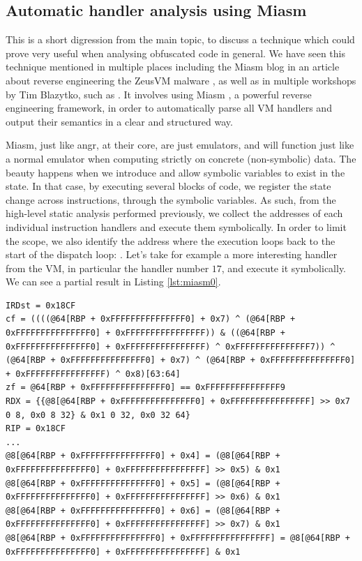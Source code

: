 \subsection{Automatic handler analysis using Miasm}
\label{sec:miasm}

This is a short digression from the main topic, to discuss a technique which could prove very useful when analysing obfuscated code in general. We have seen this technique mentioned in multiple places including the Miasm blog in an article about reverse engineering the ZeusVM malware \cite{zeusvm_miasm}, as well as in multiple workshops by Tim Blazytko, such as \cite{tim_miasm}. It involves using Miasm \cite{miasm}, a powerful reverse engineering framework, in order to automatically parse all \gls{VM} handlers and output their semantics in a clear and structured way. 

Miasm, just like angr, at their core, are just emulators, and will function just like a normal emulator when computing strictly on concrete (non-symbolic) data. The beauty happens when we introduce and allow symbolic variables to exist in the state. In that case, by executing several blocks of code, we register the state change across instructions, through the symbolic variables. As such, from the high-level static analysis performed previously, we collect the addresses of each individual instruction handlers and execute them symbolically. In order to limit the scope, we also identify the address where the execution loops back to the start of the dispatch loop: . Let's take for example a more interesting handler from the  \gls{VM}, in particular the handler number $17$, and execute it symbolically. We can see a partial result in Listing \ref{lst:miasm0}. 

\begin{lstlisting}[label={lst:miasm0}, caption={Partial result of symbolically executing a function handler in Miasm. One will notice the state change in core registers such as \cc{RDX}, flag changes, as well as changes in memory.}]
IRDst = 0x18CF
cf = ((((@64[RBP + 0xFFFFFFFFFFFFFFF0] + 0x7) ^ (@64[RBP + 0xFFFFFFFFFFFFFFF0] + 0xFFFFFFFFFFFFFFFF)) & ((@64[RBP + 0xFFFFFFFFFFFFFFF0] + 0xFFFFFFFFFFFFFFFF) ^ 0xFFFFFFFFFFFFFFF7)) ^ (@64[RBP + 0xFFFFFFFFFFFFFFF0] + 0x7) ^ (@64[RBP + 0xFFFFFFFFFFFFFFF0] + 0xFFFFFFFFFFFFFFFF) ^ 0x8)[63:64]
zf = @64[RBP + 0xFFFFFFFFFFFFFFF0] == 0xFFFFFFFFFFFFFFF9
RDX = {{@8[@64[RBP + 0xFFFFFFFFFFFFFFF0] + 0xFFFFFFFFFFFFFFFF] >> 0x7 0 8, 0x0 8 32} & 0x1 0 32, 0x0 32 64}
RIP = 0x18CF
...
@8[@64[RBP + 0xFFFFFFFFFFFFFFF0] + 0x4] = (@8[@64[RBP + 0xFFFFFFFFFFFFFFF0] + 0xFFFFFFFFFFFFFFFF] >> 0x5) & 0x1
@8[@64[RBP + 0xFFFFFFFFFFFFFFF0] + 0x5] = (@8[@64[RBP + 0xFFFFFFFFFFFFFFF0] + 0xFFFFFFFFFFFFFFFF] >> 0x6) & 0x1
@8[@64[RBP + 0xFFFFFFFFFFFFFFF0] + 0x6] = (@8[@64[RBP + 0xFFFFFFFFFFFFFFF0] + 0xFFFFFFFFFFFFFFFF] >> 0x7) & 0x1
@8[@64[RBP + 0xFFFFFFFFFFFFFFF0] + 0xFFFFFFFFFFFFFFFF] = @8[@64[RBP + 0xFFFFFFFFFFFFFFF0] + 0xFFFFFFFFFFFFFFFF] & 0x1
\end{lstlisting}

